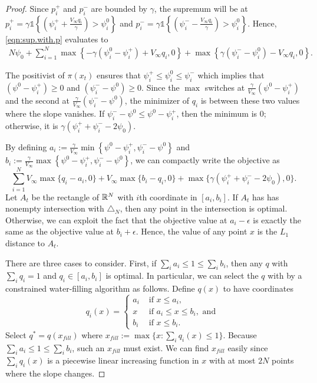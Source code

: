 \documentclass{article}
\begin{document}
\begin{proof}
Since $p_i^+$ and $p_i^-$ are bounded by $\gamma$, the supremum will be at 
$
  p_i^+
  =
  \gamma \mathds{1}\left\{\left(\psi_i^+ + \frac{V_\infty q_i}{\gamma}\right) > \psi_i^0\right\}
  $
  and
  $
  p_i^-
  =
  \gamma \mathds{1}\left\{\left(\psi_i^- - \frac{V_\infty q_i}{\gamma}\right) > \psi_i^0\right\}
$.
Hence, \eqref{eqn:sup.with.p} evaluates to 
\begin{align*}  
  N\psi_0
  + \sum_{i=1}^N
  \max \left\{-\gamma(\psi_i^0-\psi_i^+) + V_\infty q_i, 0\right\}
  +
  \max \left\{\gamma(\psi_i^--\psi_i^0) - V_\infty q_i, 0\right\}.
\end{align*}

The positivist of $\pi(x_t)$ ensures that $\psi_i^+ \leq \psi_i^0 \leq \psi_i^-$ which implies that $(\psi^0-\psi_i^+)\geq 0$ and $(\psi_i^--\psi^0)\geq 0$. Since the $\max$ switches at $\frac{\gamma}{V_\infty}(\psi^0 - \psi_i^+)$ and the second at $\frac{\gamma}{V_\infty}(\psi_i^--\psi^0)$, the minimizer of $q_i$ is between these two values where the slope vanishes. If
$\psi_i^--\psi^0 \leq \psi^0 - \psi_i^+$,
then the minimum is $0$; otherwise, it is $\gamma (\psi_i^++\psi_i^- -2\psi_0)$. 

By defining $a_i := \frac{\gamma}{V_\infty} \min \left\{ \psi^0 - \psi_i^+, \psi_i^--\psi^0 \right\}$ and $ b_i := \frac{\gamma}{V_\infty} \max \left\{ \psi^0 - \psi_i^+, \psi_i^--\psi^0 \right\}$, we can compactly write the objective as 
\[
  \sum_{i=1}^N
  V_\infty\max\{q_i-a_i,0\}
  +
  V_\infty\max\{b_i-q_i,0\}
  +
  \max\{ \gamma (\psi_i^++\psi_i^- -2\psi_0), 0\}.
\]
Let $A_t$ be the rectangle of $\mathbb R^N$ with $i$th coordinate in $[a_i, b_i]$. If $A_t$ has  has nonempty intersection with $\triangle_N$, then any point in the intersection is optimal. Otherwise, we can exploit the fact that the objective value at $a_i - \epsilon$ is exactly the same as the objective value at $b_i + \epsilon$. Hence, the value of any point $x$ is the $L_1$ distance to $A_t$.

  There are three cases to consider. First, if $\sum_i a_i \leq 1 \leq \sum_i b_i$, then any $q$ with $\sum_i q_i = 1$ and $q_i \in [a_i,b_i]$ is optimal. In particular, we can select the $q$ with by a constrained water-filling algorithm as follows. Define $q(x)$ to have coordinates
\[
    q_i(x) =
    \begin{cases}
      a_i & \text{ if } x \leq a_i, \\
      x & \text{ if } a_i \leq x \leq b_i, \text{ and }\\
      b_i & \text{ if } x \leq b_i.
    \end{cases}
\]
Select $q^* = q(x_{fill})$ where $x_{fill} := \max\{x : \sum_i q_i(x) \leq 1\}$. Because $\sum_i a_i \leq 1 \leq \sum_i b_i$, such an $x_{fill}$ must exist. We can find $x_{fill}$ easily since $\sum_i q_i(x)$ is a piecewise linear increasing function in $x$ with at most $2N$ points where the slope changes.



\end{proof}
\end{document}
